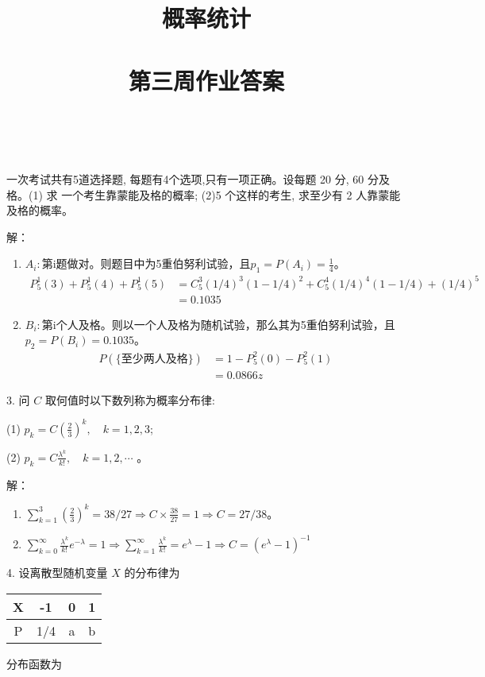\documentclass[14pt]{scrartcl} %
\title{	
	\normalfont \huge
	\textsc{概率统计} \\ [25pt] %
	\horrule{0.5pt} \\[0.4cm] %
	\huge 第三周作业答案 \\ %
	\horrule{0.5pt} \\[0.4cm] %
	\date{}
}
\numberwithin{equation}{section} %
\numberwithin{figure}{section} %
\numberwithin{table}{section} %
\begin{document}
	 一次考试共有5道选择题, 每题有4个选项,只有一项正确。设每题 20 分, 60 分及格。(1) 求 一个考生靠蒙能及格的概率; (2)5 个这样的考生, 求至少有 2 人靠蒙能及格的概率。
	
	\vspace*{1cm}
	解：
	\begin{enumerate}[(1)]
		\item $A_i:$第i题做对。则题目中为5重伯努利试验，且$p_1 = P(A_i) = \frac{1}{4}$。
		\begin{align}
			P_5^1(3) + P_5^1(4) + P_5^1(5) & = C_5^3(1 / 4) ^ 3 ( 1 - 1 / 4) ^ 2 + C_5^4(1 / 4) ^ 4 ( 1 - 1 / 4) + (1 / 4) ^ 5 \\
			& = 0.1035
		\end{align}
		\item
		$B_i:$第i个人及格。则以一个人及格为随机试验，那么其为5重伯努利试验，且$p_2 = P(B_i) = 0.1035$。
		\begin{align}
			P(\{\text{至少两人及格}\}) & = 1 - P_5^2(0) - P_5^2(1) \\
			& = 0.0866z
		\end{align}
	\end{enumerate}
	\vspace{1cm}
	3. 问 $C$ 取何值时以下数列称为概率分布律:
	
	(1) $p_{k}=C\left(\frac{2}{3}\right)^{k}, \quad k=1,2,3$;
	
	(2) $p_{k}=C \frac{\lambda^{k}}{k !}, \quad k=1,2, \cdots$ 。
	
	\vspace*{1cm}
	解：
	\begin{enumerate}[(1)]
		\item $\sum_{k = 1}^{3}(\frac{2}{3})^k = 38 / 27 \Rightarrow C \times \frac{38}{27} = 1 \Rightarrow C = 27 / 38$。
		\item $\sum_{k = 0}^{\infty}\frac{\lambda ^ k}{k!}e ^ {-\lambda} = 1 \Rightarrow \sum_{k = 1}^{\infty}\frac{\lambda ^ k}{k!} = e ^ {\lambda} - 1 \Rightarrow C = (e ^ {\lambda} - 1) ^ {- 1}$
	\end{enumerate}
	4. 设离散型随机变量 $X$ 的分布律为
	\begin{tabular}{c|ccc}
		
		X & -1 & 0 & 1 \\
		\hline
		P & 1/4 & a & b \\
		
	\end{tabular}
	分布函数为 
	
\end{document}
